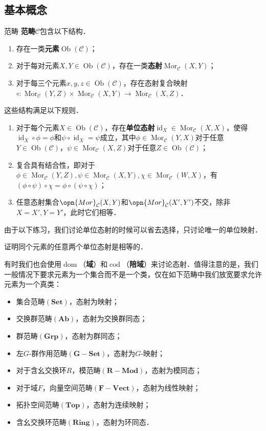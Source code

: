 
\subsection{基本概念}
\begin{definition}{范畴}
\textbf{范畴}$\mathcal{C}$包含以下结构．
\begin{enumerate}
    \item 存在一类\textbf{元素}$\operatorname{Ob}(\mathcal{C})$；
    \item 对于每对元素$X,Y\in\operatorname{Ob}(\mathcal{C})$，存在一类\textbf{态射}$\operatorname{Mor}_\mathcal{C}(X,Y)$；
    \item 对于每三个元素$x,y,z\in\operatorname{Ob}(\mathcal{C})$，存在态射复合映射${\circ}:\operatorname{Mor}_\mathcal{C}(Y,Z)\times\operatorname{Mor}_{\mathcal{C}}(X,Y)\to\operatorname{Mor}_\mathcal{C}(X,Z)$．
\end{enumerate}
这些结构满足以下规则．
\begin{enumerate}
    \item 对于每个元素$X\in\operatorname{Ob}(\mathcal{C})$，存在\textbf{单位态射}$\operatorname{id}_X\in\operatorname{Mor}_\mathcal{C}(X,X)$，使得$\operatorname{id}_X\circ\phi=\phi$和$\psi\circ\operatorname{id}_X=\psi$成立，其中$\phi\in\operatorname{Mor}_\mathcal{C}(Y,X)$对于任意$Y\in\operatorname{Ob}(\mathcal{C})$，$\psi\in\operatorname{Mor}_\mathcal{C}(X,Z)$对于任意$Z\in\operatorname{Ob}(\mathcal{C})$；
    \item 复合具有结合性，即对于$\phi\in\operatorname{Mor}_\mathcal{C}(Y,Z),\psi\in\operatorname{Mor}_\mathcal{C}(X,Y),\chi\in\operatorname{Mor}_\mathcal{C}(W,X)$，有$(\phi\circ\psi)\circ\chi=\phi\circ(\psi\circ\chi)$；
    \item 任意态射集合$\opn{Mor}_\mathcal{C}(X,Y)$和$\opn{Mor}_\mathcal{C}(X',Y')$不交，除非$X=X',Y=Y'$，此时它们相等．
\end{enumerate}
\end{definition}
由于以下练习，我们讨论单位态射的时候可以省去选择，只讨论唯一的单位映射．
\begin{exercise}{}
证明同个元素的任意两个单位态射是相等的．
\end{exercise}
有时我们也会使用$\operatorname{dom}$（\textbf{域}）和$\operatorname{cod}$（\textbf{陪域}）来讨论态射．值得注意的是，我们一般情况下要求元素为一个集合而不是一个类，仅在如下范畴中我们放宽要求允许元素为一个真类：
\begin{itemize}
    \item 集合范畴$(\mathbf{Set})$，态射为映射；
    \item 交换群范畴$(\mathbf{Ab})$，态射为交换群同态；
    \item 群范畴$(\mathbf{Grp})$，态射为群同态；
    \item 左$G$-群作用范畴$(\mathbf{G{-}Set})$，态射为$G$-映射；
    \item 对于含幺交换环$R$，模范畴$(\mathbf{R{-}Mod})$，态射为模同态；
    \item 对于域$F$，向量空间范畴$(\mathbf{F{-}Vect})$，态射为线性映射；
    \item 拓扑空间范畴$(\mathbf{Top})$，态射为连续映射；
    \item 含幺交换环范畴$(\mathbf{Ring})$，态射为环同态．
\end{itemize}

